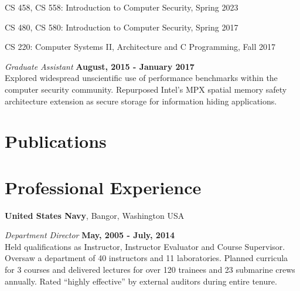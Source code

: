 \documentclass[margin,line]{res}
\begin{document}
\begin{resume}
\vspace*{.05in}
\begin{list2}
\item CS 458, CS 558: Introduction to Computer Security, Spring 2023
\item CS 480, CS 580: Introduction to Computer Security, Spring 2017
\item CS 220: Computer Systems II, Architecture and C Programming, Fall 2017
\end{list2}

\vspace{-.1cm}
{\em Graduate Assistant} \hfill {\bf August, 2015 - January 2017}\\
Explored widespread unscientific use of performance benchmarks within the computer security community. Repurposed Intel's MPX spatial memory safety architecture extension as secure storage for information hiding applications.

\section{\sc Publications}




\section{\sc Professional Experience}

{\bf United States Navy}, Bangor, Washington USA

\vspace{-.3cm}
{\em Department Director} \hfill {\bf May, 2005 - July, 2014}\\
Held qualifications as 
Instructor, Instructor Evaluator and Course Supervisor. Oversaw a department of 40 instructors and 11 laboratories. Planned curricula for 3 courses and delivered lectures for over 120 trainees and 23 submarine crews annually. Rated ``highly effective'' by external auditors during entire tenure.


\end{resume}
\end{document}
